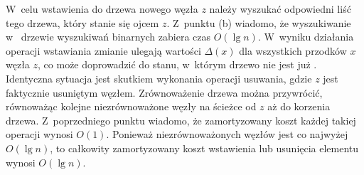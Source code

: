 \subproblem %
W~celu wstawienia do drzewa nowego węzła $z$ należy wyszukać odpowiedni liść tego drzewa, który stanie się ojcem $z$.
Z~punktu (b) wiadomo, że wyszukiwanie w~ drzewie wyszukiwań binarnych zabiera czas $O(\lg n)$.
W~wyniku działania operacji wstawiania zmianie ulegają wartości $\Delta(x)$ dla wszystkich przodków $x$ węzła $z$, co może doprowadzić do stanu, w~którym drzewo nie jest już .
Identyczna sytuacja jest skutkiem wykonania operacji usuwania, gdzie $z$ jest faktycznie usuniętym węzłem.
Zrównoważenie drzewa można przywrócić, równoważąc kolejne niezrównoważone węzły na ścieżce od $z$ aż do korzenia drzewa.
Z~poprzedniego punktu wiadomo, że zamortyzowany koszt każdej takiej operacji wynosi $O(1)$.
Ponieważ niezrównoważonych węzłów jest co najwyżej $O(\lg n)$, to całkowity zamortyzowany koszt wstawienia lub usunięcia elementu wynosi $O(\lg n)$.
